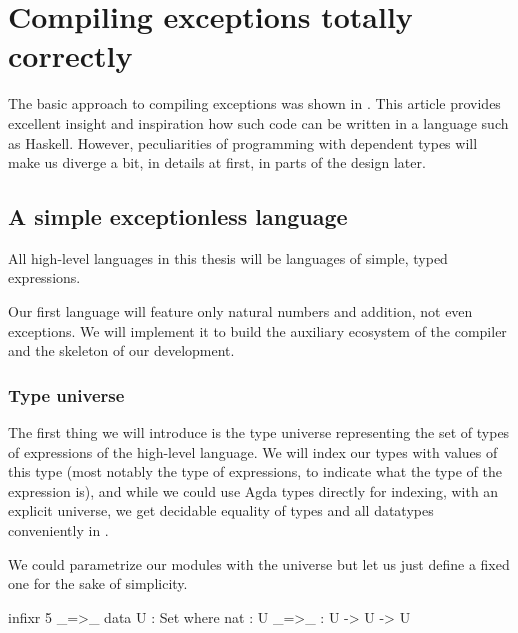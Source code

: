 \chapter{Compiling exceptions totally correctly}


The basic approach to compiling exceptions was shown in \cite{gmh:exceptions}.
This article provides excellent insight and inspiration how such code can be written
in a language such as Haskell.
However, peculiarities of programming with dependent types will make us
diverge a bit, in details at first, in parts of the design later.

\section{A simple exceptionless language}

All high-level languages in this thesis will be languages of simple, typed
expressions.

Our first language will feature only natural numbers and addition, not even
exceptions. We will implement it to build the auxiliary ecosystem of the
compiler and the skeleton of our development.


\subsection{Type universe}


The first thing we will introduce is the type universe representing the set of
types of expressions of the high-level language. We will index our types with
values of this type (most notably the type  of expressions, to
indicate what the type of the expression is), and while we could use Agda types
directly for indexing, with an explicit universe, we get decidable equality of
types and all datatypes conveniently in .

We could parametrize our
modules with the universe but let us just define a fixed one for the sake of
simplicity.

\begin{code}
  infixr 5 _=>\_
  data U : Set where
    nat : U
    _=>\_ : U -> U -> U
\end{code}


